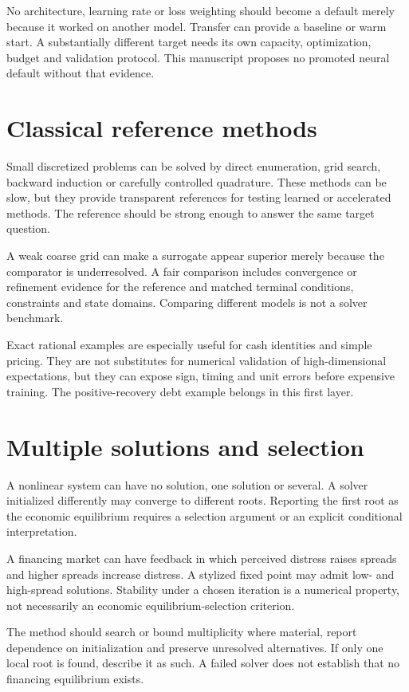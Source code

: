 No architecture, learning rate or loss weighting should become a default merely because it worked on another model. Transfer can provide a baseline or warm start. A substantially different target needs its own capacity, optimization, budget and validation protocol. This manuscript proposes no promoted neural default without that evidence.



\section{Classical reference methods}
Small discretized problems can be solved by direct enumeration, grid search, backward induction or carefully controlled quadrature. These methods can be slow, but they provide transparent references for testing learned or accelerated methods. The reference should be strong enough to answer the same target question.

A weak coarse grid can make a surrogate appear superior merely because the comparator is underresolved. A fair comparison includes convergence or refinement evidence for the reference and matched terminal conditions, constraints and state domains. Comparing different models is not a solver benchmark.

Exact rational examples are especially useful for cash identities and simple pricing. They are not substitutes for numerical validation of high-dimensional expectations, but they can expose sign, timing and unit errors before expensive training. The positive-recovery debt example belongs in this first layer.

\section{Multiple solutions and selection}
A nonlinear system can have no solution, one solution or several. A solver initialized differently may converge to different roots. Reporting the first root as the economic equilibrium requires a selection argument or an explicit conditional interpretation.

A financing market can have feedback in which perceived distress raises spreads and higher spreads increase distress. A stylized fixed point may admit low- and high-spread solutions. Stability under a chosen iteration is a numerical property, not necessarily an economic equilibrium-selection criterion.

The method should search or bound multiplicity where material, report dependence on initialization and preserve unresolved alternatives. If only one local root is found, describe it as such. A failed solver does not establish that no financing equilibrium exists.

